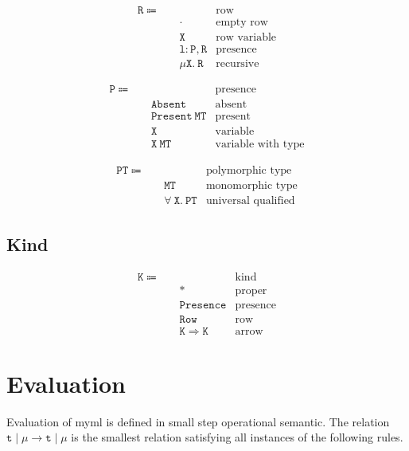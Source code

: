 \documentclass{report}
\newcommand{\theLang}{myml}
\newcommand{\code}{\mathtt}
\begin{document}
\begin{align*}
\code{R} \Coloneqq \quad & & \text{row} \\
& \code{\cdot} & \text{empty row} \\
& \code{X} & \text{row variable} \\
& \code{l : P, R} & \text{presence} \\
& \code{\mu X.\ R} & \text{recursive}
\end{align*}

\begin{align*}
\code{P} \Coloneqq \quad & & \text{presence} \\
& \code{Absent} & \text{absent} \\
& \code{Present\ MT} & \text{present} \\
& \code{X} & \text{variable} \\
& \code{X\ MT} & \text{variable with type}
\end{align*}

\begin{align*}
\code{PT} \Coloneqq\quad & & \text{polymorphic type} \\
& \code{MT} & \text{monomorphic type} \\
& \code{\forall\ X.\ PT} & \text{universal qualified}
\end{align*}

\subsection{Kind}

\begin{align*}
\code{K} \Coloneqq \quad & & \text{kind} \\
& \code{*} & \text{proper} \\
& \code{Presence} & \text{presence} \\
& \code{Row} & \text{row} \\
& \code{K \Rightarrow K} & \text{arrow}
\end{align*}

\section{Evaluation}

Evaluation of \theLang{} is defined in small step operational semantic. The relation \(\code{t}\mid\mu \longrightarrow \code{t}\mid\mu\) is the smallest relation satisfying all instances of the following rules.
\end{document}
